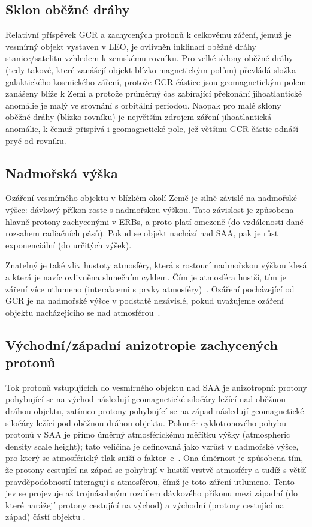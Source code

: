 \subsection{Sklon oběžné dráhy}
Relativní příspěvek GCR a zachycených protonů k celkovému záření, jemuž je vesmírný objekt vystaven v LEO, je ovlivněn inklinací oběžné dráhy stanice/satelitu vzhledem k zemskému rovníku. Pro velké sklony oběžné dráhy (tedy takové, které zanášejí objekt blízko magnetickým polům) převládá složka galaktického kosmického záření, protože GCR částice jsou geomagnetickým polem zanášeny blíže k Zemi a protože průměrný čas zabírající překonání jihoatlantické anomálie je malý ve srovnání s orbitální periodou. Naopak pro malé sklony oběžné dráhy (blízko rovníku) je největším zdrojem záření jihoatlantická anomálie, k čemuž přispívá i geomagnetické pole, jež většinu GCR částic odnáší pryč od rovníku.
\subsection{Nadmořská výška}\label{sec:kosmickeZareni_altitude}
Ozáření vesmírného objektu v blízkém okolí Země je silně závislé na nadmořské výšce: dávkový příkon roste s nadmořskou výškou. Tato závislost je způsobena hlavně protony zachycenými v ERBs, a proto platí omezeně (do vzdálenosti dané rozsahem radiačních pásů). Pokud se objekt nachází nad SAA, pak je růst exponenciální (do určitých výšek). 

Znatelný je také vliv hustoty atmosféry, která s rostoucí nadmořskou výškou klesá a která je navíc ovlivněna slunečním cyklem. Čím je atmosféra hustší, tím je záření více utlumeno (interakcemi s prvky atmosféry)~\cite{benton}. Ozáření pocházející od GCR je na nadmořské výšce v podstatě nezávislé, pokud uvažujeme ozáření objektu nacházejícího se nad atmosférou~\cite{dosis}. 
\subsection{Východní/západní anizotropie zachycených protonů}\label{sec:kosmickeZareni_anizotropie}
Tok protonů vstupujících do vesmírného objektu nad SAA je anizotropní: protony pohybující se na východ následují geomagnetické siločáry ležící nad oběžnou dráhou objektu, zatímco protony pohybující se na západ následují geomagnetické siločáry ležící pod oběžnou dráhou objektu. Poloměr cyklotronového pohybu protonů v SAA %
je přímo úměrný atmosférickému měřítku výšky (atmospheric density scale height); tato veličina je definovaná jako vzrůst v nadmořské výšce, pro který se atmosférický tlak sníží o faktor~e~\cite{scaleHeight_wiki}. Ona úměrnost je způsobena tím, že protony cestující na západ se pohybují v hustší vrstvě atmosféry a tudíž s větší pravděpodobností interagují s atmosférou, čímž je toto záření utlumeno. Tento jev se projevuje až trojnásobným rozdílem dávkového příkonu mezi západní (do které narážejí protony cestující na východ) a východní (protony cestující na západ) částí objektu \cite{benton}. 
